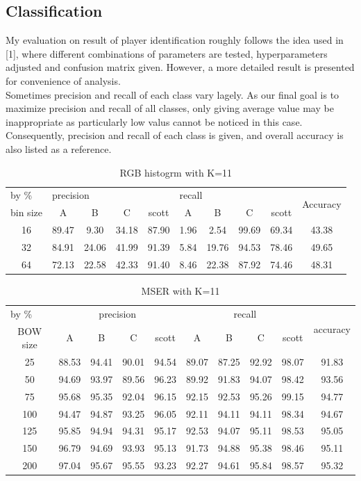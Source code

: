 \documentclass{article}
\begin{document}
\subsection{Classification}
My evaluation on result of player identification roughly follows the idea used in [1], where different combinations of parameters are tested, hyperparameters adjusted and confusion matrix given. However, a more detailed result is presented for convenience of analysis.\\
Sometimes precision and recall of each class vary lagely. As our final goal is to maximize precision and recall of all classes, only giving average value may be inappropriate as particularly low valus cannot be noticed in this case. Consequently, precision and recall of each class is given, and overall accuracy is also listed as a reference.
\begin{table}[]
\centering
\begin{tabular}{|c|c|c|c|c|c|c|c|c|c|}
\hline
\multicolumn{1}{|l|}{by \%} & \multicolumn{4}{l|}{precision} & \multicolumn{4}{l|}{recall} & \multirow{2}{*}{Accuracy} \\ \cline{1-9}
\multicolumn{1}{|l|}{bin size} & A & B & C & scott & A & B & C & scott &  \\ \hline
16 & 89.47 & 9.30 & 34.18 & 87.90 & 1.96 & 2.54 & 99.69 & 69.34 & 43.38 \\ \hline
32 & 84.91 & 24.06 & 41.99 & 91.39 & 5.84 & 19.76 & 94.53 & 78.46 & 49.65 \\ \hline
64 & 72.13 & 22.58 & 42.33 & 91.40 & 8.46 & 22.38 & 87.92 & 74.46 & 48.31 \\ \hline
\end{tabular}
\caption{RGB histogrm with K=11}
\end{table}

\begin{table}[]
\begin{tabular}{|c|c|c|c|c|c|c|c|c|c|}
\hline
\multicolumn{1}{|l|}{by \%} & \multicolumn{4}{c|}{precision} & \multicolumn{4}{c|}{recall} & \multicolumn{1}{l|}{\multirow{2}{*}{accuracy}} \\ \cline{1-9}
BOW size & A & B & C & scott & A & B & C & scott & \multicolumn{1}{l|}{} \\ \hline
25 & 88.53 & 94.41 & 90.01 & 94.54 & 89.07 & 87.25 & 92.92 & 98.07 & 91.83 \\ \hline
50 & 94.69 & 93.97 & 89.56 & 96.23 & 89.92 & 91.83 & 94.07 & 98.42 & 93.56 \\ \hline
75 & 95.68 & 95.35 & 92.04 & 96.15 & 92.15 & 92.53 & 95.26 & 99.15 & 94.77 \\ \hline
100 & 94.47 & 94.87 & 93.25 & 96.05 & 92.11 & 94.11 & 94.11 & 98.34 & 94.67 \\ \hline
125 & 95.85 & 94.94 & 94.31 & 95.17 & 92.53 & 94.07 & 95.11 & 98.53 & 95.05 \\ \hline
150 & 96.79 & 94.69 & 93.93 & 95.13 & 91.73 & 94.88 & 95.38 & 98.46 & 95.11 \\ \hline
200 & 97.04 & 95.67 & 95.55 & 93.23 & 92.27 & 94.61 & 95.84 & 98.57 & 95.32 \\ \hline
\end{tabular}
\caption{MSER with K=11}
\end{table}
\end{document}
